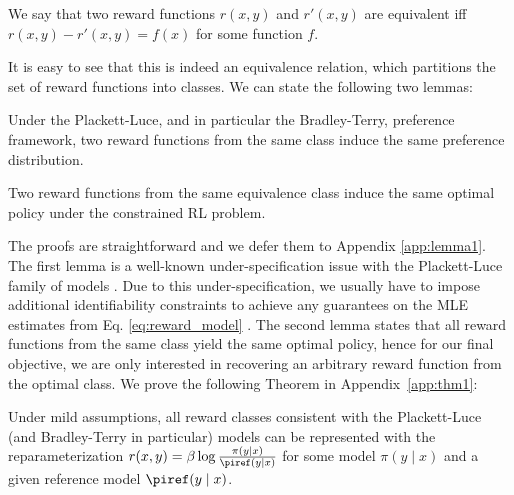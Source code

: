 \begin{definition}
We say that two reward functions $r(x, y)$ and $r'(x, y)$ are equivalent iff ${r(x, y)-r'(x, y) = f(x)}$ for some function $f$.     
\end{definition}
It is easy to see that this is indeed an equivalence relation, which partitions the set of reward functions into classes. We can state the following two lemmas:

\begin{lemma}\label{lemma:same_prefrence} Under the Plackett-Luce, and in particular the Bradley-Terry, preference framework, two reward functions from the same class induce the same preference distribution.
\end{lemma}

\begin{lemma}\label{lemma:same_policy}
    Two reward functions from the same equivalence class induce the same optimal policy under the constrained RL problem.
\end{lemma}
The proofs are straightforward and we defer them to Appendix \ref{app:lemma1}. The first lemma is a well-known under-specification issue with the Plackett-Luce family of models \cite{plackett1975analysis}. Due to this under-specification, we usually have to impose additional identifiability constraints to achieve any guarantees on the MLE estimates from Eq. \ref{eq:reward_model} \cite{bong2022generalized}. The second lemma states that all reward functions from the same class yield the same optimal policy, hence for our final objective, we are only interested in recovering an arbitrary reward function from the optimal class. We prove the following Theorem in Appendix~\ref{app:thm1}:
\begin{theorem}\label{thm:main}
    Under mild assumptions, all reward classes consistent with the Plackett-Luce (and Bradley-Terry in particular) models can be represented with the reparameterization ${r(x, y) = \beta \log \frac{\pi(y\mid x)}{\piref(y\mid x)}}$ for some model $\pi(y\mid x)$ and a given reference model $\piref(y \mid x)$.
\end{theorem}
